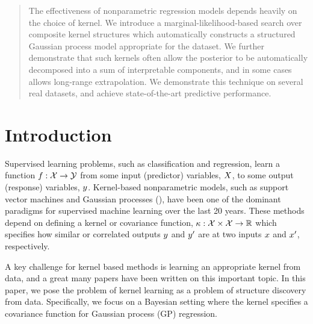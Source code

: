\documentclass[twoside]{article}
\begin{document}

\begin{abstract}
The effectiveness of nonparametric regression models depends heavily on the choice of kernel.
We introduce a marginal-likelihood-based search over composite kernel structures which automatically constructs a structured Gaussian process model appropriate for the dataset.
We further demonstrate that such kernels often allow the posterior to be automatically decomposed into a sum of interpretable components, and in some cases allows long-range extrapolation.
We demonstrate this technique on several real datasets, and achieve state-of-the-art predictive performance.
\end{abstract}

\section{Introduction}

Supervised learning problems, such as classification and regression, learn a function ${f : \mathcal{X} \to \mathcal{Y}}$ from some input (predictor) variables, $X$, to some output (response) variables, $y$.
Kernel-based nonparametric models, such as support vector machines and Gaussian processes (\gp{}), have been one of the dominant paradigms for supervised machine learning over the last 20 years.
These methods depend on defining a kernel or covariance function, $\kappa : \mathcal{X} \times \mathcal{X} \to \mathbb{R}$ which specifies how similar or correlated outputs $y$ and $y'$ are at two inputs $x$ and $x'$, respectively.

A key challenge for kernel based methods is learning an appropriate kernel from data, and a great many papers have been written on this important topic. 
In this paper, we pose the problem of kernel learning as a problem of structure discovery from data.
Specifically, we focus on a Bayesian setting where the kernel specifies a covariance function for Gaussian process (GP) regression. 
\end{document}
